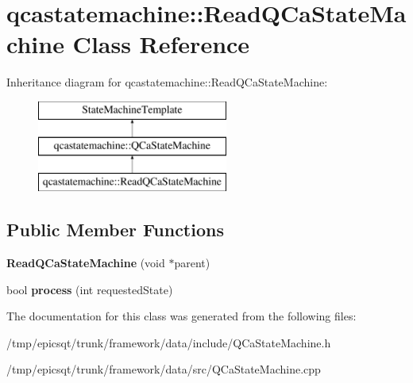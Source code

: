 \hypertarget{classqcastatemachine_1_1ReadQCaStateMachine}{
\section{qcastatemachine::ReadQCaStateMachine Class Reference}
\label{classqcastatemachine_1_1ReadQCaStateMachine}
}
Inheritance diagram for qcastatemachine::ReadQCaStateMachine:\begin{figure}[H]
\begin{center}
\leavevmode
\includegraphics[height=3.000000cm]{classqcastatemachine_1_1ReadQCaStateMachine}
\end{center}
\end{figure}
\subsection*{Public Member Functions}
\begin{DoxyCompactItemize}
\item 
\hypertarget{classqcastatemachine_1_1ReadQCaStateMachine_a4b7b63912a5cfd5c60995d2e63c77d3f}{
{\bfseries ReadQCaStateMachine} (void $\ast$parent)}
\label{classqcastatemachine_1_1ReadQCaStateMachine_a4b7b63912a5cfd5c60995d2e63c77d3f}

\item 
\hypertarget{classqcastatemachine_1_1ReadQCaStateMachine_a27f7057902edad27ff4678bd2942f083}{
bool {\bfseries process} (int requestedState)}
\label{classqcastatemachine_1_1ReadQCaStateMachine_a27f7057902edad27ff4678bd2942f083}

\end{DoxyCompactItemize}


The documentation for this class was generated from the following files:\begin{DoxyCompactItemize}
\item 
/tmp/epicsqt/trunk/framework/data/include/QCaStateMachine.h\item 
/tmp/epicsqt/trunk/framework/data/src/QCaStateMachine.cpp\end{DoxyCompactItemize}

